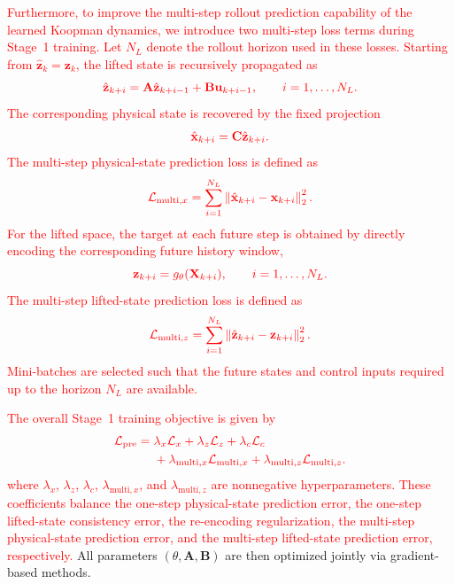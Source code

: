 \documentclass[journal]{IEEEtran}
\newcommand{\vx}{\mathbf{x}}
\newcommand{\vu}{\mathbf{u}}
\newcommand{\vz}{\mathbf{z}}
\newcommand{\mA}{\mathbf{A}}
\newcommand{\mB}{\mathbf{B}}
\newcommand{\mC}{\mathbf{C}}
\newcommand{\mX}{\mathbf{X}}
\begin{document}
\textcolor{red}{Furthermore, to improve the multi-step rollout prediction capability of the learned Koopman dynamics, we introduce two multi-step loss terms during Stage~1 training. Let $N_L$ denote the rollout horizon used in these losses. Starting from $\hat{\vz}_{k}=\vz_k$, the lifted state is recursively propagated as}
\begin{equation}
    \color{red}
    \hat{\vz}_{k+i}
    =
    \mA\hat{\vz}_{k+i-1}
    +
    \mB\vu_{k+i-1},
    \qquad
    i=1,\ldots,N_L.
    \label{eq:multi_step_lifted_rollout}
\end{equation}
\textcolor{red}{The corresponding physical state is recovered by the fixed projection}
\begin{equation}
    \color{red}
    \hat{\vx}_{k+i}
    =
    \mC\hat{\vz}_{k+i}.
    \label{eq:multi_step_state_rollout}
\end{equation}
\textcolor{red}{The multi-step physical-state prediction loss is defined as}
\begin{equation}
    \color{red}
    \mathcal{L}_{\mathrm{multi},x}
    =
    \sum_{i=1}^{N_L}
    \left\|
    \hat{\vx}_{k+i}
    -
    \vx_{k+i}
    \right\|_2^2.
    \label{eq:loss_multi_x}
\end{equation}
\textcolor{red}{For the lifted space, the target at each future step is obtained by directly encoding the corresponding future history window,}
\begin{equation}
    \color{red}
    \vz_{k+i}=g_\theta(\mX_{k+i}),
    \qquad i=1,\ldots,N_L.
\end{equation}
\textcolor{red}{The multi-step lifted-state prediction loss is defined as}
\begin{equation}
    \color{red}
    \mathcal{L}_{\mathrm{multi},z}
    =
    \sum_{i=1}^{N_L}
    \left\|
    \hat{\vz}_{k+i}
    -
    \vz_{k+i}
    \right\|_2^2.
    \label{eq:loss_multi_z}
\end{equation}
\textcolor{red}{Mini-batches are selected such that the future states and control inputs required up to the horizon $N_L$ are available.}

\textcolor{red}{The overall Stage~1 training objective is given by}
\begin{equation}
    \color{red}
    \begin{aligned}
    \mathcal{L}_{\mathrm{pre}}
    =
    {}&
    \lambda_x \mathcal{L}_x
    +
    \lambda_z \mathcal{L}_z
    +
    \lambda_c \mathcal{L}_c
    \\
    &+
    \lambda_{\mathrm{multi},x}
    \mathcal{L}_{\mathrm{multi},x}
    +
    \lambda_{\mathrm{multi},z}
    \mathcal{L}_{\mathrm{multi},z}.
    \end{aligned}
    \label{eq:pretraining_loss}
\end{equation}
\textcolor{red}{where $\lambda_x$, $\lambda_z$, $\lambda_c$, $\lambda_{\mathrm{multi},x}$, and $\lambda_{\mathrm{multi},z}$ are nonnegative hyperparameters. These coefficients balance the one-step physical-state prediction error, the one-step lifted-state consistency error, the re-encoding regularization, the multi-step physical-state prediction error, and the multi-step lifted-state prediction error, respectively.} All parameters $(\theta, \mA, \mB)$ are then optimized jointly via gradient-based methods.
\end{document}
